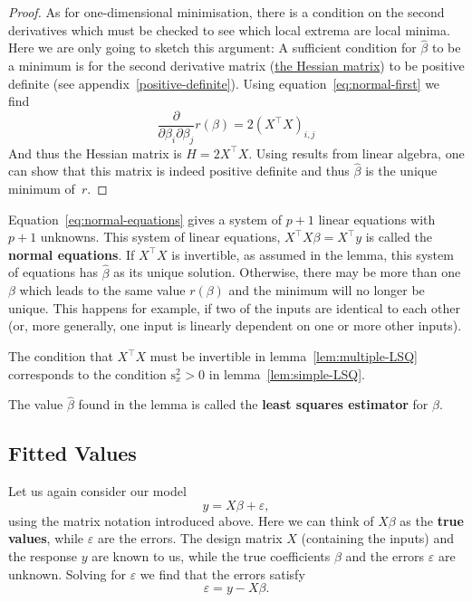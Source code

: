 \documentclass[
  a4paper,
]{article}
\theoremstyle{definition}
\theoremstyle{definition}
\theoremstyle{definition}
\theoremstyle{definition}
\theoremstyle{remark}
\begin{document}
\begin{proof}
As for one-dimensional minimisation, there is a condition on the
second derivatives which must be checked to see which local extrema
are local minima. Here we are only going to sketch this argument: A
sufficient condition for \(\hat\beta\) to be a minimum is for the
second derivative matrix (\href{https://en.wikipedia.org/wiki/Hessian_matrix}{the Hessian
matrix})
to be positive definite (see appendix~\ref{positive-definite}).
Using equation~\eqref{eq:normal-first} we find
\begin{equation*}
    \frac{\partial}{\partial\beta_i \partial\beta_j} r(\beta)
    = 2 (X^\top X)_{i,j}
  \end{equation*}
And thus the Hessian matrix is \(H = 2 X^\top X\). Using results from
linear algebra, one can show that this matrix is indeed positive
definite and thus \(\hat\beta\) is the unique minimum of~\(r\).
\end{proof}

Equation~\eqref{eq:normal-equations} gives a system of \(p+1\) linear
equations with \(p+1\) unknowns. This system of linear equations,
\(X^\top X \beta = X^\top y\) is called the \textbf{normal equations}.
If \(X^\top X\) is invertible, as assumed in the lemma, this
system of equations has \(\hat\beta\) as its unique solution.
Otherwise, there may be more than one \(\beta\) which leads to the
same value \(r(\beta)\) and the minimum will no longer be unique.
This happens for example, if two of the inputs are identical to
each other (or, more generally, one input is linearly dependent
on one or more other inputs).

The condition that \(X^\top X\) must be invertible in
lemma~\ref{lem:multiple-LSQ}
corresponds to the condition \(\mathrm{s}_x^2 > 0\) in
lemma~\ref{lem:simple-LSQ}.

The value \(\hat\beta\) found in the lemma is called the \textbf{least squares
estimator} for \(\beta\).

\hypertarget{fitted-values}{%
\subsection{Fitted Values}\label{fitted-values}}

Let us again consider our model
\begin{equation*}
  y = X \beta + \varepsilon,
\end{equation*}
using the matrix notation introduced above. Here we can think of
\(X\beta\) as the \textbf{true values}, while \(\varepsilon\) are the errors. The
design matrix \(X\) (containing the inputs) and the response \(y\) are
known to us, while the true coefficients \(\beta\) and the errors \(\varepsilon\)
are unknown. Solving for \(\varepsilon\) we find that the errors satisfy
\begin{equation*}
  \varepsilon= y - X\beta.
\end{equation*}
\end{document}
